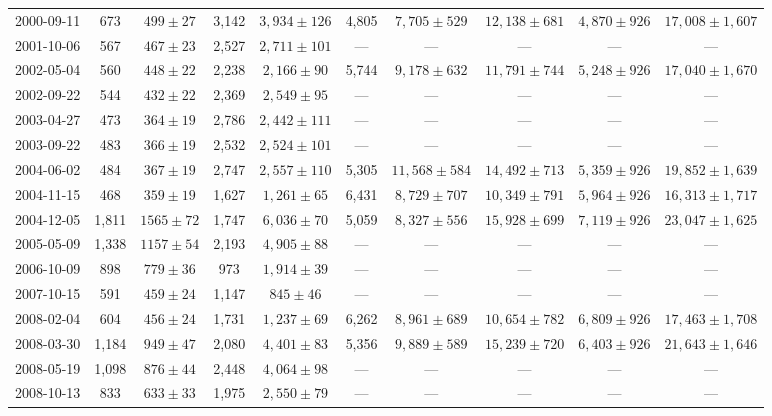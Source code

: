 \begin{landscape}
\begin{longtable}{cccccccccc}
{2000-09-11} & 673 & {$499  \pm  27$} & 3,142 & {$3,934 \pm 126$} & 4,805 & {$7,705 \pm 529$} & {$12,138 \pm 681$} & {$4,870 \pm 926$} & {$17,008 \pm 1,607$} \\
{2001-10-06} & 567 & {$467  \pm  23$} & 2,527 & {$2,711 \pm 101$} & --- & --- & --- & --- & --- \\
{2002-05-04} & 560 & {$448  \pm  22$} & 2,238 & {$2,166 \pm 90$} & 5,744 & {$9,178 \pm 632$} & {$11,791 \pm 744$} & {$5,248 \pm 926$} & {$17,040 \pm 1,670$} \\
{2002-09-22} & 544 & {$432  \pm  22$} & 2,369 & {$2,549 \pm 95$} & --- & --- & --- & --- & --- \\
{2003-04-27} & 473 & {$364  \pm  19$} & 2,786 & {$2,442 \pm 111$} & --- & --- & --- & --- & --- \\
{2003-09-22} & 483 & {$366  \pm  19$} & 2,532 & {$2,524 \pm 101$} & --- & --- & --- & --- & --- \\
{2004-06-02} & 484 & {$367  \pm  19$} & 2,747 & {$2,557 \pm 110$} & 5,305 & {$11,568 \pm 584$} & {$14,492 \pm 713$} & {$5,359 \pm 926$} & {$19,852 \pm 1,639$} \\
{2004-11-15} & 468 & {$359  \pm  19$} & 1,627 & {$1,261 \pm 65$} & 6,431 & {$8,729 \pm 707$} & {$10,349 \pm 791$} & {$5,964 \pm 926$} & {$16,313 \pm 1,717$} \\
{2004-12-05} & 1,811 & {$1565  \pm  72$} & 1,747 & {$6,036 \pm 70$} & 5,059 & {$8,327 \pm 556$} & {$15,928 \pm 699$} & {$7,119 \pm 926$} & {$23,047 \pm 1,625$} \\
{2005-05-09} & 1,338 & {$1157  \pm  54$} & 2,193 & {$4,905 \pm 88$} & --- & --- & --- & --- & --- \\
{2006-10-09} & 898 & {$779  \pm  36$} & 973 & {$1,914 \pm 39$} & --- & --- & --- & --- & --- \\
{2007-10-15} & 591 & {$459  \pm  24$} & 1,147 & {$845 \pm 46$} & --- & --- & --- & --- & --- \\
{2008-02-04} & 604 & {$456  \pm  24$} & 1,731 & {$1,237 \pm 69$} & 6,262 & {$8,961 \pm 689$} & {$10,654 \pm 782$} & {$6,809 \pm 926$} & {$17,463 \pm 1,708$} \\
{2008-03-30} & 1,184 & {$949  \pm  47$} & 2,080 & {$4,401 \pm 83$} & 5,356 & {$9,889 \pm 589$} & {$15,239 \pm 720$} & {$6,403 \pm 926$} & {$21,643 \pm 1,646$} \\
{2008-05-19} & 1,098 & {$876  \pm  44$} & 2,448 & {$4,064 \pm 98$} & --- & --- & --- & --- & --- \\
{2008-10-13} & 833 & {$633  \pm  33$} & 1,975 & {$2,550 \pm 79$} & --- & --- & --- & --- & --- \\

\end{longtable}
\end{landscape}
